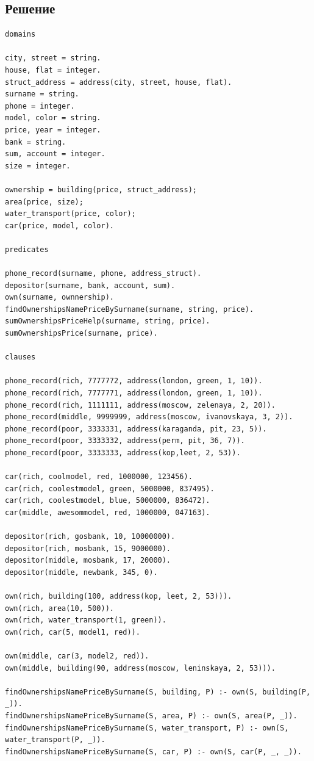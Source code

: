 \documentclass[12pt]{report}
\begin{document}
	\subsection*{Решение}
	\begin{lstlisting}
domains

city, street = string.
house, flat = integer.
struct_address = address(city, street, house, flat).
surname = string.
phone = integer.
model, color = string.
price, year = integer.
bank = string.
sum, account = integer.
size = integer.

ownership = building(price, struct_address);
area(price, size);
water_transport(price, color);
car(price, model, color).

predicates

phone_record(surname, phone, address_struct).
depositor(surname, bank, account, sum).
own(surname, ownnership).
findOwnershipsNamePriceBySurname(surname, string, price).
sumOwnershipsPriceHelp(surname, string, price).
sumOwnershipsPrice(surname, price).

clauses

phone_record(rich, 7777772, address(london, green, 1, 10)).
phone_record(rich, 7777771, address(london, green, 1, 10)).
phone_record(rich, 1111111, address(moscow, zelenaya, 2, 20)).
phone_record(middle, 9999999, address(moscow, ivanovskaya, 3, 2)).
phone_record(poor, 3333331, address(karaganda, pit, 23, 5)).
phone_record(poor, 3333332, address(perm, pit, 36, 7)).
phone_record(poor, 3333333, address(kop,leet, 2, 53)).

car(rich, coolmodel, red, 1000000, 123456).
car(rich, coolestmodel, green, 5000000, 837495).
car(rich, coolestmodel, blue, 5000000, 836472).
car(middle, awesommodel, red, 1000000, 047163).

depositor(rich, gosbank, 10, 10000000).
depositor(rich, mosbank, 15, 9000000).
depositor(middle, mosbank, 17, 20000).
depositor(middle, newbank, 345, 0).

own(rich, building(100, address(kop, leet, 2, 53))).
own(rich, area(10, 500)).
own(rich, water_transport(1, green)).
own(rich, car(5, model1, red)).

own(middle, car(3, model2, red)).
own(middle, building(90, address(moscow, leninskaya, 2, 53))).

findOwnershipsNamePriceBySurname(S, building, P) :- own(S, building(P, _)).
findOwnershipsNamePriceBySurname(S, area, P) :- own(S, area(P, _)).
findOwnershipsNamePriceBySurname(S, water_transport, P) :- own(S, water_transport(P, _)).
findOwnershipsNamePriceBySurname(S, car, P) :- own(S, car(P, _, _)).


\end{lstlisting}
\end{document}
